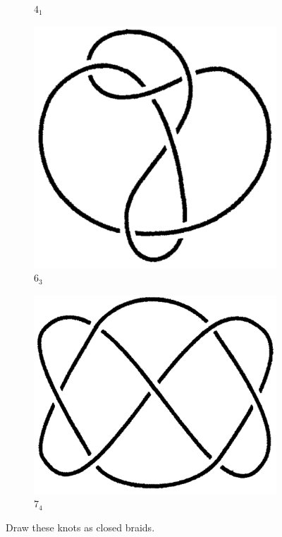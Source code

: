 \documentclass[titlepage]{article}
\numberwithin{figure}{section}
\numberwithin{table}{section}
\numberwithin{equation}{section}
\begin{document}
\begin{itemize}
\begin{figure}[h!]
\begin{subfigure}[b]{0.2\linewidth}
            \caption{$4_1$}
            \label{fig:ex5-16a}
        \end{subfigure}
        \begin{subfigure}[b]{0.2\linewidth}
            \centering
            \includegraphics[width=0.8\linewidth]{Blender/ex2-3b.png}
            \caption{$6_3$}
            \label{fig:ex5-16b}
        \end{subfigure}
        \begin{subfigure}[b]{0.2\linewidth}
            \centering
            \includegraphics[width=0.85\linewidth]{Blender/ex1-22.png}
            \caption{$7_4$}
            \label{fig:ex5-16c}
        \end{subfigure}
        \caption{Draw these knots as closed braids.}

\end{figure}
\end{itemize}
\end{document}
